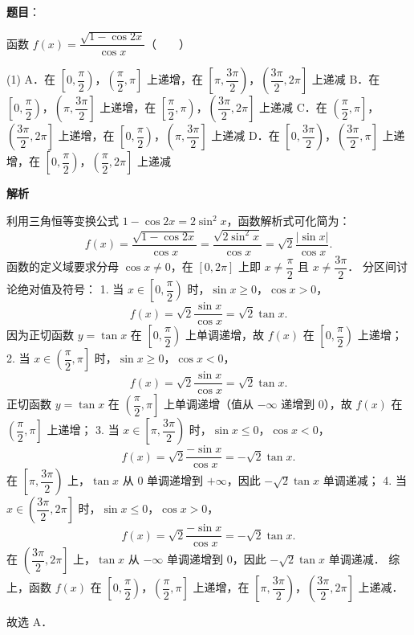 \begin{answer}

\textbf{题目}：

函数 $f(x) = \dfrac{\sqrt{1 - \cos 2x}}{\cos x}$\mbox{（　　）}

\begin{gkopts}(1)
\task A．在 $\left[0, \dfrac{\pi}{2}\right)$，$\left(\dfrac{\pi}{2}, \pi\right]$ 上递增，在 $\left[\pi, \dfrac{3\pi}{2}\right)$，$\left(\dfrac{3\pi}{2}, 2\pi\right]$ 上递减
\task B．在 $\left[0, \dfrac{\pi}{2}\right)$，$\left(\pi, \dfrac{3\pi}{2}\right]$ 上递增，在 $\left[\dfrac{\pi}{2}, \pi\right)$，$\left(\dfrac{3\pi}{2}, 2\pi\right]$ 上递减
\task C．在 $\left(\dfrac{\pi}{2}, \pi\right]$，$\left(\dfrac{3\pi}{2}, 2\pi\right]$ 上递增，在 $\left[0, \dfrac{\pi}{2}\right)$，$\left(\pi, \dfrac{3\pi}{2}\right]$ 上递减
\task D．在 $\left[0, \dfrac{3\pi}{2}\right)$，$\left(\dfrac{3\pi}{2}, \pi\right]$ 上递增，在 $\left[0, \dfrac{\pi}{2}\right)$，$\left(\dfrac{\pi}{2}, 2\pi\right]$ 上递减
\end{gkopts}

\textbf{解析}

利用三角恒等变换公式 $1 - \cos 2x = 2\sin^2 x$，函数解析式可化简为：
\nopagebreak[4]
\[
f(x) = \frac{\sqrt{1 - \cos 2x}}{\cos x} = \frac{\sqrt{2\sin^2 x}}{\cos x} = \sqrt{2}\frac{|\sin x|}{\cos x}.
\]
函数的定义域要求分母 $\cos x \neq 0$，在 $[0, 2\pi]$ 上即 $x \neq \dfrac{\pi}{2}$ 且 $x \neq \dfrac{3\pi}{2}$．
分区间讨论绝对值及符号：
1. 当 $x \in \left[0, \dfrac{\pi}{2}\right)$ 时，$\sin x \geqslant 0$，$\cos x > 0$，
\nopagebreak[4]
\[f(x) = \sqrt{2}\frac{\sin x}{\cos x} = \sqrt{2}\tan x.\]
   因为正切函数 $y = \tan x$ 在 $\left[0, \dfrac{\pi}{2}\right)$ 上单调递增，故 $f(x)$ 在 $\left[0, \dfrac{\pi}{2}\right)$ 上递增；
2. 当 $x \in \left(\dfrac{\pi}{2}, \pi\right]$ 时，$\sin x \geqslant 0$，$\cos x < 0$，
\nopagebreak[4]
\[f(x) = \sqrt{2}\frac{\sin x}{\cos x} = \sqrt{2}\tan x.\]
   正切函数 $y = \tan x$ 在 $\left(\dfrac{\pi}{2}, \pi\right]$ 上单调递增（值从 $-\infty$ 递增到 0），故 $f(x)$ 在 $\left(\dfrac{\pi}{2}, \pi\right]$ 上递增；
3. 当 $x \in \left[\pi, \dfrac{3\pi}{2}\right)$ 时，$\sin x \leqslant 0$，$\cos x < 0$，
\nopagebreak[4]
\[f(x) = \sqrt{2}\frac{-\sin x}{\cos x} = -\sqrt{2}\tan x.\]
   在 $\left[\pi, \dfrac{3\pi}{2}\right)$ 上，$\tan x$ 从 0 单调递增到 $+\infty$，因此 $-\sqrt{2}\tan x$ 单调递减；
4. 当 $x \in \left(\dfrac{3\pi}{2}, 2\pi\right]$ 时，$\sin x \leqslant 0$，$\cos x > 0$，
\nopagebreak[4]
\[f(x) = \sqrt{2}\frac{-\sin x}{\cos x} = -\sqrt{2}\tan x.\]
   在 $\left(\dfrac{3\pi}{2}, 2\pi\right]$ 上，$\tan x$ 从 $-\infty$ 单调递增到 0，因此 $-\sqrt{2}\tan x$ 单调递减．
综上，函数 $f(x)$ 在 $\left[0, \dfrac{\pi}{2}\right)$，$\left(\dfrac{\pi}{2}, \pi\right]$ 上递增，在 $\left[\pi, \dfrac{3\pi}{2}\right)$，$\left(\dfrac{3\pi}{2}, 2\pi\right]$ 上递减．

故选 A．


\end{answer}
